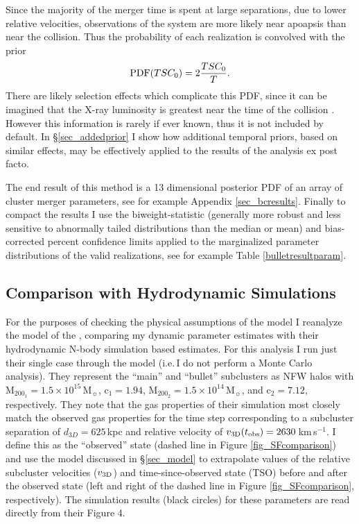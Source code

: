 Since the majority of the merger time is spent at large separations, due to lower relative velocities, observations of the system are more likely near apoapsis than near the collision.  Thus the probability of each realization is convolved with the prior 
\begin{equation}
{\rm PDF}(TSC_0) = 2 \frac{TSC_0}{T}.
\label{eq_timeprior}
\end{equation}
There are likely selection effects which complicate this PDF, since it can be imagined that the X-ray luminosity is greatest near the time of the collision \citep[see e.g.][]{Randall:2002kk}.
However this information is rarely if ever known, thus it is not included by default.  In \S\ref{sec_addedprior} I show how additional temporal priors, based on similar effects, may be effectively applied to the results of the analysis ex post facto.

The end result of this method is a 13 dimensional posterior PDF of an array of cluster merger parameters, see for example Appendix \ref{sec_bcresults}.
Finally to compact the results I use the biweight-statistic (generally more robust and less sensitive to abnormally tailed distributions than the median or mean) and bias-corrected percent confidence limits \citep{Beers:1990kg} applied to the marginalized parameter distributions of the valid realizations, see for example Table \ref{bulletresultparam}.


\subsection{Comparison with Hydrodynamic Simulations} \label{sec_sfcomp}

For the purposes of checking the physical assumptions of the model I reanalyze the \citet{Springel:2007bg} model of the , comparing my dynamic parameter estimates with their hydrodynamic N-body simulation based estimates.
For this analysis I run just their single case through the model (i.e.\,I do not perform a Monte Carlo analysis).
They represent the ``main'' and ``bullet'' subclusters as NFW halos with  M$_{200_1} = 1.5\times 10^{15} $\,M$_\sun$, c$_1=1.94$, M$_{200_2} = 1.5\times 10^{14}$\,M$_\sun$, and c$_2=7.12$, respectively.
They note that the gas properties of their simulation most closely match the observed  gas properties for the time step corresponding to a subcluster separation of $d_{3D}=625$\,kpc and  relative velocity of $v_{\rm 3D}(t_{\rm obs})=2630$\,km\,s$^{-1}$.
I define this as the ``observed'' state (dashed line in Figure \ref{fig_SFcomparison}) and use the model discussed in \S \ref{sec_model} to extrapolate values of the relative subcluster velocities ($v_{\rm 3D}$) and time-since-observed state (TSO) before and after the observed state (left and right of the dashed line in Figure \ref{fig_SFcomparison}, respectively).
The \citet{Springel:2007bg} simulation results (black circles) for these parameters are read directly from their Figure 4.

